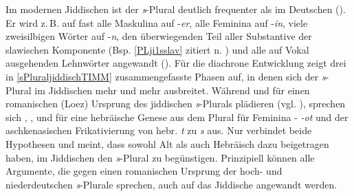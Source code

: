  Im modernen Jiddischen ist der \textit{s}-Plural deutlich frequenter als im Deutschen (\cite{Timm2007}). Er wird z.\,B. auf fast alle Maskulina auf -\textit{er}, alle Feminina auf -\textit{in}, viele zweisilbigen Wörter auf -\textit{n}, den überwiegenden Teil aller Substantive der slawischen Komponente (Bsp. \ref{PLji1sslav} zitiert n. \cite[163]{Jacobs2005}) und alle auf Vokal ausgehenden Lehnwörter angewandt (\cite{Timm2007}). Für die diachrone Entwicklung zeigt \textcite{Timm2007} drei in \ref{sPluraljiddischTIMM} zusammengefasste Phasen auf, in denen sich der \textit{s}-Plural im Jiddischen mehr und mehr ausbreitet. Während \textcite[28, 115]{Bin-Nun1973} und \textcite{Timm2007} für einen romanischen (Loez) Ursprung des jiddischen \textit{s}-Plurals plädieren (vgl. \cite{Neuberg2007}), sprechen sich \textcite[37]{Birnbaum1922}, \textcite{King1990}, \textcite[399]{Krogh2001} und \textcite[402]{Jacobsetal2013} für eine hebräische Genese aus dem Plural für Feminina - \textit{-ot} und der aschkenasischen Frikativierung von hebr.  \textit{t} zu \textit{s} aus. Nur \textcite[63–68]{Weinreich1973} verbindet beide Hypothesen und meint, dass sowohl Alt als auch Hebräisch dazu beigetragen haben, im Jiddischen den \textit{s}-Plural zu begünstigen. Prinzipiell können alle Argumente, die gegen einen romanischen Ursprung der hoch- und niederdeutschen \textit{s}-Plurale sprechen, auch auf das Jiddische angewandt werden.\\ 
 
   \label{sPluraljiddischTIMM}
 

